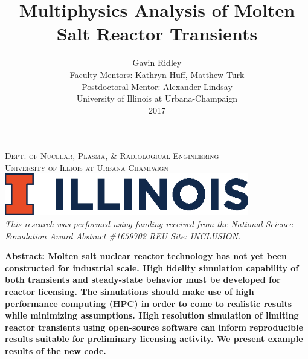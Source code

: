 \begin{titlepage}
    \textsc{\large Dept. of Nuclear, Plasma, \& Radiological Engineering}\\%
    
    \textsc{\large University of Illiois at Urbana-Champaign}\\ %


    
    
    \vspace{0.5cm}
    \includegraphics[width=0.8\textwidth]{illinois}\\[1cm] %
     

    \textit{This research was performed using funding received from the 
    National Science Foundation Award Abstract \#1659702 REU Site: INCLUSION.}
\end{titlepage}





\title{Multiphysics Analysis of Molten Salt Reactor Transients}
\author{Gavin Ridley\\
        Faculty Mentors: Kathryn Huff, Matthew Turk \\
        Postdoctoral Mentor: Alexander Lindsay \\
        University of Illinois at Urbana-Champaign \\
        2017 \\}
\maketitle

\textbf{Abstract: Molten salt nuclear reactor technology has not yet been constructed for industrial scale.
 High fidelity simulation capability of both transients and steady-state behavior must be developed
for reactor licensing. The simulations should make use of high performance computing (HPC) in order
to come to realistic results while minimizing assumptions. High resolution simulation of limiting reactor transients using
open-source software can inform reproducible results suitable for preliminary licensing activity. We present example results of the new code.}

